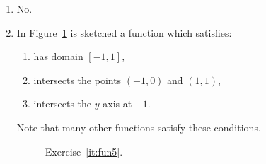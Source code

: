 \begin{enumerate}
		\item No.
	
\item \label{it:fun5} In Figure~\ref{fig:fun5} is sketched a function which satisfies:
\begin{enumerate}
	\item has domain $[-1,1]$,
	\item intersects the points $(-1,0)$ and $(1,1)$,
	\item intersects the $y$-axis at $-1$.
\end{enumerate}
Note that many other functions satisfy these conditions.


\begin{figure}
	\centering
	\caption{Exercise~\ref{it:fun5}.}
	\label{fig:fun5}
\end{figure}
	
\end{enumerate}